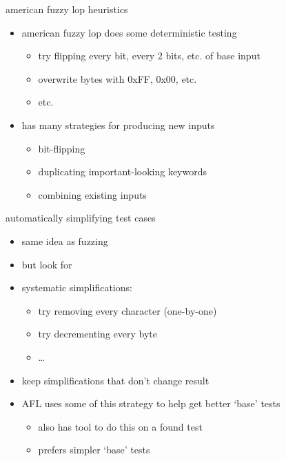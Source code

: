 \begin{frame}{american fuzzy lop heuristics}
    \begin{itemize}
    \item american fuzzy lop does some deterministic testing
        \begin{itemize}
        \item try flipping every bit, every 2 bits, etc. of base input
        \item overwrite bytes with 0xFF, 0x00, etc.
        \item etc.
        \end{itemize}
    \item has many strategies for producing new inputs
        \begin{itemize}
        \item bit-flipping
        \item duplicating important-looking keywords
        \item combining existing inputs
        \end{itemize}
    \end{itemize}
\end{frame}

\begin{frame}[fragile,label=covMin]{automatically simplifying test cases}
    \begin{itemize}
        \item same idea as fuzzing
        \item but look for 
        \item systematic simplifications:
            \begin{itemize}
                \item try removing every character (one-by-one)
                \item try decrementing every byte
                \item \ldots
            \end{itemize}
        \item keep simplifications that don't change result
        \item AFL uses some of this strategy to help get better `base' tests
            \begin{itemize}
            \item also has tool to do this on a found test
            \item prefers simpler `base' tests
            \end{itemize}
    \end{itemize}
\end{frame}

